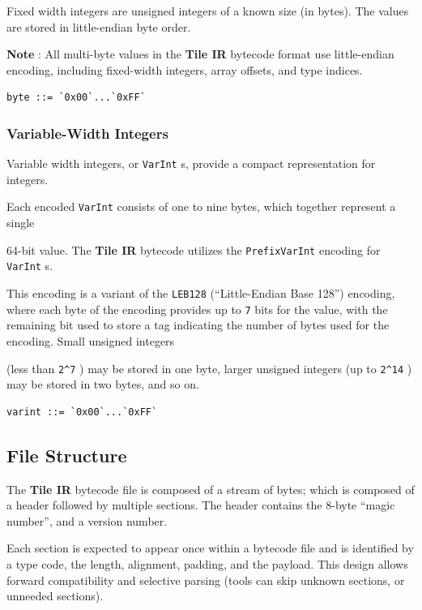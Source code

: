 \documentclass{article}
\begin{document}
Fixed width integers are unsigned integers of a known size (in bytes). The values are stored in little-endian byte order.


\textbf{Note} : All multi-byte values in the \textbf{Tile IR} bytecode format use little-endian encoding, including fixed-width integers, array offsets, and type indices.


\begin{lstlisting}
byte ::= `0x00`...`0xFF`
\end{lstlisting}


\subsubsection{Variable-Width Integers}

Variable width integers, or \texttt{VarInt} s, provide a compact representation for integers.

Each encoded \texttt{VarInt} consists of one to nine bytes, which together represent a single

64-bit value. The \textbf{Tile IR} bytecode utilizes the \texttt{PrefixVarInt} encoding for \texttt{VarInt} s.

This encoding is a variant of the \texttt{LEB128} (``Little-Endian Base 128'') encoding, where each byte of the encoding provides up to \texttt{7} bits for the value, with the remaining bit used to store a tag indicating the number of bytes used for the encoding. Small unsigned integers

(less than \texttt{2\textasciicircum{}7} ) may be stored in one byte, larger unsigned integers (up to \texttt{2\textasciicircum{}14} ) may be stored in two bytes, and so on.


\begin{lstlisting}
varint ::= `0x00`...`0xFF`
\end{lstlisting}


\subsection{File Structure}

The \textbf{Tile IR} bytecode file is composed of a stream of bytes; which is composed of a header followed by multiple sections. The header contains the 8-byte ``magic number'', and a version number.


Each section is expected to appear once within a bytecode file and is identified by a type code, the length, alignment, padding, and the payload. This design allows forward compatibility and selective parsing (tools can skip unknown sections, or unneeded sections).
\end{document}
